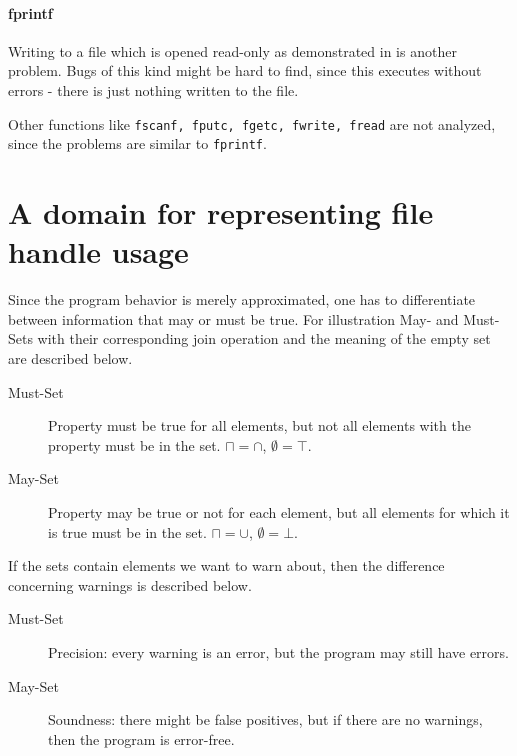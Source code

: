 \paragraph*{fprintf}
Writing to a file which is opened read-only as demonstrated in  is another problem. Bugs of this kind might be hard to find, since this executes without errors - there is just nothing written to the file.

Other functions like \verb|fscanf, fputc, fgetc, fwrite, fread| are not analyzed, since the problems are similar to \verb|fprintf|.


\section{A domain for representing file handle usage}
Since the program behavior is merely approximated, one has to differentiate between information that may or must be true. For illustration May- and Must-Sets with their corresponding join operation and the meaning of the empty set are described below.
\begin{description}
\item[Must-Set] Property must be true for all elements, but not all elements with the property must be in the set. $\sqcap = \cap$, $\emptyset = \top$.
\item[May-Set] Property may be true or not for each element, but all elements for which  it is true must be in the set. $\sqcap = \cup$, $\emptyset = \bot$.
\end{description}
If the sets contain elements we want to warn about, then the difference concerning warnings is described below.
\begin{description}
\item[Must-Set] Precision: every warning is an error, but the program may still have errors.
\item[May-Set] Soundness: there might be false positives, but if there are no warnings, then the program is error-free.
\end{description}

